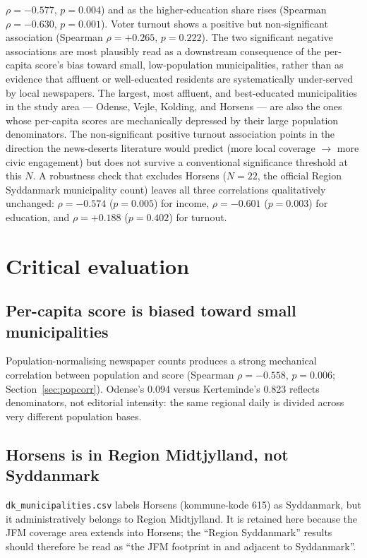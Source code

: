 \documentclass[12pt, a4paper]{article}
\begin{document}
$\rho = -0.577$, $p = 0.004$) and as the higher-education share rises (Spearman
$\rho = -0.630$, $p = 0.001$). Voter turnout shows a positive but non-significant
association (Spearman $\rho = +0.265$, $p = 0.222$).
The two significant negative associations are most plausibly read as a downstream
consequence of the per-capita score's bias toward small, low-population
municipalities, rather
than as evidence that affluent or well-educated residents are systematically
under-served by local newspapers. The largest, most affluent, and best-educated
municipalities in the study area --- Odense, Vejle, Kolding, and Horsens --- are
also the ones whose per-capita scores are mechanically depressed by their large
population denominators. The non-significant positive turnout association points in
the direction the news-deserts literature would predict (more local coverage
$\rightarrow$ more civic engagement) but does not survive a conventional
significance threshold at this $N$. A robustness check that excludes Horsens
($N = 22$, the official Region Syddanmark municipality count) leaves all three
correlations qualitatively unchanged: $\rho = -0.574$ ($p = 0.005$) for income,
$\rho = -0.601$ ($p = 0.003$) for education, and $\rho = +0.188$ ($p = 0.402$) for
turnout.

\section{Critical evaluation}
\subsection{Per-capita score is biased toward small municipalities}
\label{sec:bias}
Population-normalising newspaper counts produces a strong mechanical correlation between population and score (Spearman $\rho = -0.558$, $p = 0.006$;
Section~\ref{sec:popcorr}). Odense's 0.094 versus Kerteminde's 0.823 reflects denominators, not editorial intensity: the same regional daily is divided across very different population bases.

\subsection{Horsens is in Region Midtjylland, not Syddanmark}
\texttt{dk\_municipalities.csv} labels Horsens (kommune-kode 615) as Syddanmark,
but it administratively belongs to Region Midtjylland. It is retained here because
the JFM coverage area extends into Horsens; the ``Region Syddanmark'' results
should therefore be read as ``the JFM footprint in and adjacent to Syddanmark''.
\end{document}
